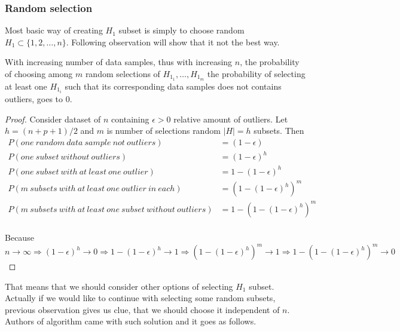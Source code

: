 \subsubsection{Random selection}
Most basic way of creating $H_1$ subset is simply to choose random $H_1 \subset \{{1,2,\ldots , n\}}$. Following observation will show that it not the best way.

\begin{observation} \label{hrandomsamples}
	With increasing number of data samples, thus with increasing $n$, the probability of choosing among $m$ random selections of $H_{1_1}, \ldots ,H_{1_m}$ the probability of selecting
	at least one $H_{1_i}$ such that its corresponding data samples does not contains outliers, goes to $0$.
\end{observation}

\begin{proof}
	Consider dataset of $n$ containing $\epsilon > 0$ relative amount of outliers. Let $h=(n+p+1)/2$ and $m$ is number of selections random $|H| = h$ subsets. Then
	\begin{align*}
		P(one~random~data~sample~not~outliers) &= (1-\epsilon) \\
		P(one~subset~without~outliers) &= (1-\epsilon)^h \\
		P(one~subset~with~at~least~one~outlier) &= 1-(1-\epsilon)^h \\
		P(m~subsets~with~at~least~one~outlier~in~each) &= (1-(1-\epsilon)^h)^m \\
		P(m~subsets~with~at~least~one~subset~without~outliers) &= 1-(1-(1-\epsilon)^h)^m \\
	\end{align*}

	Because $n \rightarrow \infty 	
	\Rightarrow (1-\epsilon)^h  \rightarrow 0 	
	\Rightarrow 1- (1-\epsilon)^h  \rightarrow 1
	\Rightarrow (1-(1-\epsilon)^h)^m  \rightarrow 1
	\Rightarrow 1- (1-(1-\epsilon)^h)^m  \rightarrow 0 $
\end{proof}

That means that we should consider other options of selecting $H_1$ subset. Actually if we would like to continue with selecting some random subsets, previous observation gives us clue, that we should choose it independent of $n$. Authors of algorithm came with such solution and it goes as follows.

